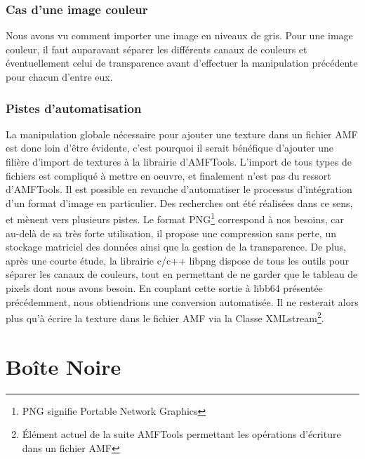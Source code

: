 \documentclass{tnreport}
\begin{document}
\subsubsection{Cas d'une image couleur}
Nous avons vu comment importer une image en niveaux de gris. Pour une image couleur, il faut auparavant séparer les différents canaux de couleurs et éventuellement celui de transparence avant d'effectuer la manipulation précédente pour chacun d'entre eux.

\subsubsection{Pistes d'automatisation}
La manipulation globale nécessaire pour ajouter une texture dans un fichier AMF est donc loin d'être évidente, c'est pourquoi il serait bénéfique d'ajouter une filière d'import de textures à la librairie d'AMFTools. L'import de tous types de fichiers est compliqué à mettre en oeuvre, et finalement n'est pas du ressort d'AMFTools. Il est possible en revanche d'automatiser le processus d'intégration d'un format d'image en particulier. Des recherches ont été réalisées dans ce sens, et mènent vers plusieurs pistes. Le format PNG\footnote{PNG signifie Portable Network Graphics} correspond à nos besoins, car au-delà de sa très forte utilisation, il propose une compression sans perte, un stockage matriciel des données ainsi que la gestion de la transparence. De plus, après une courte étude, la librairie c/c++ libpng dispose de tous les outils pour séparer les canaux de couleurs, tout en permettant de ne garder que le tableau de pixels dont nous avons besoin. En couplant cette sortie à libb64 présentée précédemment, nous obtiendrions une conversion automatisée. Il ne resterait alors plus qu'à écrire la texture dans le fichier AMF via la Classe XMLstream\footnote{Élément actuel de la suite AMFTools permettant les opérations d'écriture dans un fichier AMF}.   

\newpage
\section{Boîte Noire}
\end{document}
